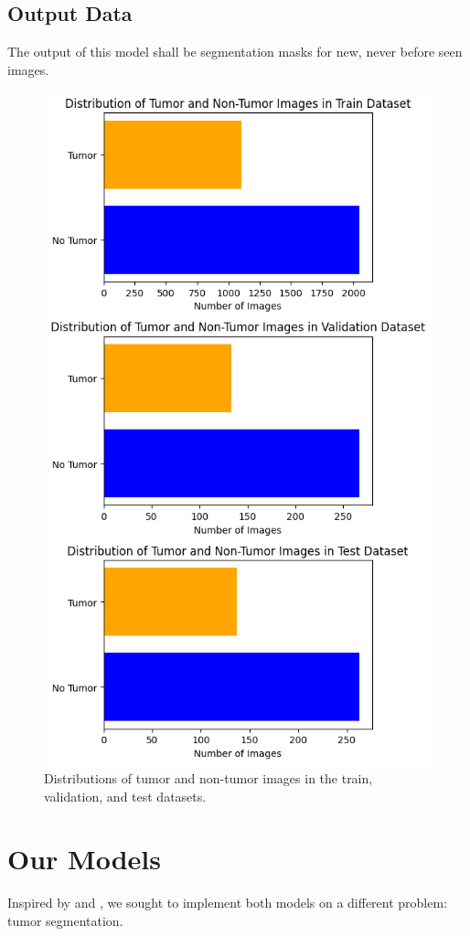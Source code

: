 \documentclass[conference]{IEEEtran}
\begin{document}
\subsection{Output Data}\label{sec3}
The output of this model shall be segmentation masks for new, never before seen images.
\begin{figure}[h!]
    \centering
    \includegraphics[width=0.75\columnwidth]{imgs/data_stats.png}
    \caption{Distributions of tumor and non-tumor images in the train, validation, and test datasets.}
    \label{fig:datastats}
\end{figure}


\section{Our Models}

Inspired by \cite{ma2024umamba} and \cite{wu2024ultralight}, we sought to implement both models on a different problem: tumor segmentation.
\end{document}
